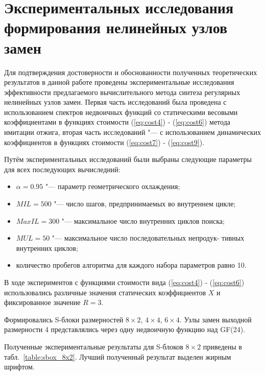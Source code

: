 \section{Экспериментальных исследования формирования нелинейных узлов замен}
\label{section:sboxes_design}

Для подтверждения достоверности и обоснованности полученных теоретических
результатов в данной работе проведены экспериментальные исследования
эффективности предлагаемого вычислительного метода синтеза регулярных нелинейных
узлов замен. Первая часть исследований была проведена с использованием спектров
недвоичных функций со статическими весовыми коэффициентами в функциях стоимости
(\ref{eq:cost4}) - (\ref{eq:cost6}) метода имитации отжига, вторая часть
исследований "--- с использованием динамических коэффициентов в функциях
стоимости (\ref{eq:cost7}) - (\ref{eq:cost9}).

Путём экспериментальных исследований были выбраны следующие параметры для всех
последующих вычиследний:

\begin{itemize}

    \item $\alpha = 0.95$ "--- параметр геометрического охлаждения;

    \item $MIL = 500$ "--- число шагов, предпринимаемых во внутреннем цикле;

    \item $MaxIL = 300$ "--- максимальное число внутренних циклов поиска;

    \item $MUL = 50$ "--- максимальное число последовательных непродук- тивных
    внутренних циклов;

    \item количество пробегов алгоритма для каждого набора параметров равно 10.

\end{itemize}

В ходе экспериментов с функциями стоимости вида (\ref{eq:cost4}) -
(\ref{eq:cost6}) использовались различные значения статических коэффициентов $X$
и фиксированное значение $R = 3$.

Формировались S-блоки размерностей $8 \times 2$, $4 \times 4$, $6 \times 4$. Узлы замен выходной
размерности 4 представлялись через одну недвоичную функцию над GF(24). 

Полученные экспериментальные результаты для S-блоков $8 \times 2$ приведены в
табл.~\ref{table:sbox_8x2}. Лучший полученный результат выделен жирным шрифтом.

